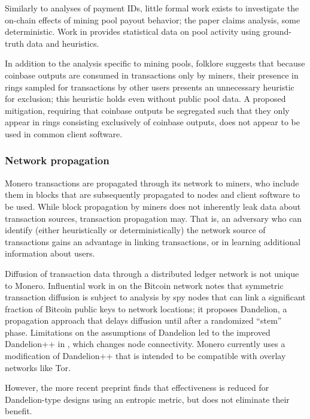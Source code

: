 \documentclass{article}
\theoremstyle{definition}
\begin{document}
Similarly to analyses of payment IDs, little formal work exists to investigate the on-chain effects of mining pool payout behavior; the paper \cite{wijaya2021transparency} claims analysis, some deterministic.
Work in \cite{moser2017empirical} provides statistical data on pool activity using ground-truth data and heuristics.

In addition to the analysis specific to mining pools, folklore suggests that because coinbase outputs are consumed in transactions only by miners, their presence in rings sampled for transactions by other users presents an unnecessary heuristic for exclusion; this heuristic holds even without public pool data.
A proposed mitigation, requiring that coinbase outputs be segregated such that they only appear in rings consisting exclusively of coinbase outputs, does not appear to be used in common client software.


\subsubsection{Network propagation}

Monero transactions are propagated through its network to miners, who include them in blocks that are subsequently propagated to nodes and client software to be used.
While block propagation by miners does not inherently leak data about transaction sources, transaction propagation may.
That is, an adversary who can identify (either heuristically or deterministically) the network source of transactions gains an advantage in linking transactions, or in learning additional information about users.

Diffusion of transaction data through a distributed ledger network is not unique to Monero.
Influential work in \cite{bojja2017dandelion} on the Bitcoin network notes that symmetric transaction diffusion is subject to analysis by spy nodes that can link a significant fraction of Bitcoin public keys to network locations; it proposes Dandelion, a propagation approach that delays diffusion until after a randomized ``stem'' phase.
Limitations on the assumptions of Dandelion led to the improved Dandelion++ in \cite{fanti2018dandelion++}, which changes node connectivity.
Monero currently uses a modification of Dandelion++ that is intended to be compatible with overlay networks like Tor.

However, the more recent preprint \cite{sharma2022anonymitypeertopeernetworkanonymity} finds that effectiveness is reduced for Dandelion-type designs using an entropic metric, but does not eliminate their benefit.
\end{document}

